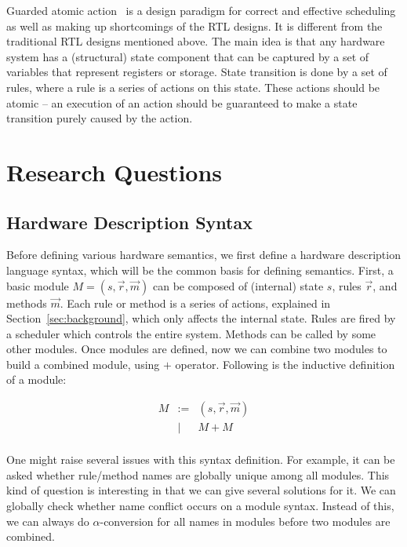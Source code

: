 Guarded atomic action~\cite{GAA} is a design paradigm for correct and
effective scheduling as well as making up shortcomings of the RTL
designs. It is different from the traditional RTL designs mentioned
above. The main idea is that any hardware system has a (structural)
state component that can be captured by a set of variables that
represent registers or storage. State transition is done by a set of
rules, where a rule is a series of actions on this state. These
actions should be atomic -- an execution of an action should be
guaranteed to make a state transition purely caused by the action.

\section{Research Questions}

\subsection{Hardware Description Syntax}

\newcommand{\Mod}{\ensuremath{M}}
\newcommand{\ModC}[3]{\ensuremath{(#1, #2, #3)}}
\newcommand{\ModP}{\ensuremath{+}}

Before defining various hardware semantics, we first define a hardware
description language syntax, which will be the common basis for
defining semantics. First, a basic module $\Mod{} =
\ModC{s}{\vec{r}}{\vec{m}}$ can be composed of (internal) state $s$,
rules $\vec{r}$, and methods $\vec{m}$. Each rule or method is a
series of actions, explained in Section~\ref{sec:background}, which
only affects the internal state. Rules are fired by a scheduler which
controls the entire system. Methods can be called by some other
modules. Once modules are defined, now we can combine two modules to
build a combined module, using \ModP{} operator. Following is the
inductive definition of a module:

$$\begin{array}{rcl}
  \Mod{} & := & \ModC{s}{\vec{r}}{\vec{m}} \\
  & | & \Mod{} \ModP{} \Mod{} \\
\end{array}$$

One might raise several issues with this syntax definition. For
example, it can be asked whether rule/method names are globally unique
among all modules. This kind of question is interesting in that we can
give several solutions for it. We can globally check whether name
conflict occurs on a module syntax. Instead of this, we can always do
$\alpha$-conversion for all names in modules before two modules are
combined.

